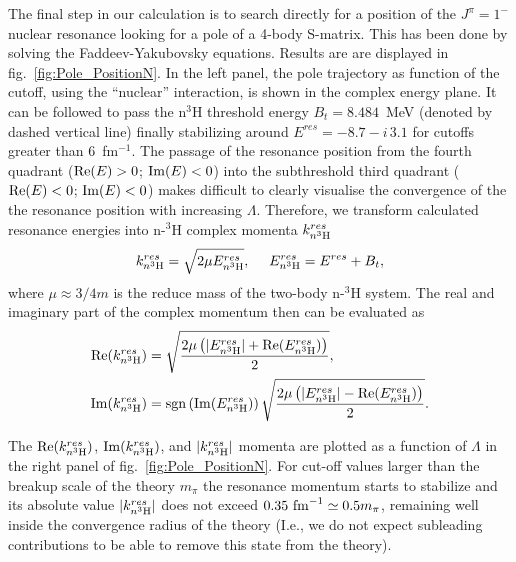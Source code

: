 \documentclass[5p,times]{elsarticle}
\begin{document}
%
The final step in our calculation is to search directly for a position of the $J^\pi=1^-$ nuclear resonance looking for a pole of a 4-body S-matrix. This has been done by solving the Faddeev-Yakubovsky equations.
Results are are displayed in fig.~\ref{fig:Pole_PositionN}.
In the left panel, the pole trajectory as function of the cutoff, using the ``nuclear'' interaction, is shown in the complex energy plane. 
It can be followed to pass the n$^3$H threshold energy $B_{t}=8.484$~MeV (denoted by dashed vertical line) finally stabilizing around $E^{res}=-8.7-i\,3.1$ for cutoffs greater than $6$~fm$^{-1}$. The passage of the resonance position from the fourth quadrant (${\rm Re}(E)>0$; ${\rm Im}(E)<0$) into the subthreshold third quadrant (${\rm Re}(E)<0$; ${\rm Im}(E)<0$) makes difficult to clearly visualise the convergence of the the resonance position with increasing $\Lambda$. 
Therefore, we transform calculated resonance energies into n-$^3$H complex momenta $k^{res}_{n ^3{\rm H}}$  
\begin{equation}
    k^{res}_{n ^3{\rm H}} = \sqrt{2 \mu E^{res}_{n ^3{\rm H}}},~~~~E^{res}_{n ^3{\rm H}}= E^{res} + B_{t},
    \label{mmnt}
\end{equation}
where $\mu \approx 3/4 m$ is the reduce mass of the two-body n-$^3$H system. The real and imaginary part of the complex momentum then can be evaluated as  
\begin{equation}
    \begin{split}
        {\rm Re}(k^{res}_{n ^3{\rm H}}) &= \sqrt{\frac{2\mu \left(|E^{res}_{n ^3{\rm H}}|+{\rm Re}(E^{res}_{n ^3{\rm H}})\right)}{2}},\\
        {\rm Im}(k^{res}_{n ^3{\rm H}}) &=  {\rm sgn}\left({\rm Im}(E^{res}_{n ^3{\rm H}})\right)\sqrt{\frac{2\mu \left(|E^{res}_{n ^3{\rm H}}|-{\rm Re}(E^{res}_{n ^3{\rm H}})\right)}{2}}.\\
    \end{split}
    \label{kreim}
\end{equation}

The ${\rm Re}(k^{res}_{n ^3{\rm H}})$, ${\rm Im}(k^{res}_{n ^3{\rm H}})$, and $|k^{res}_{n ^3{\rm H}}|$ momenta are plotted as a function of $\Lambda$ in the right panel of fig.~\ref{fig:Pole_PositionN}.  
For cut-off values larger than the breakup scale of the theory $m_\pi$ the resonance momentum starts to stabilize and its absolute value $|k^{res}_{n ^3{\rm H}}|$ does not exceed $0.35~{\rm fm}^{-1}\simeq 0.5 m_\pi$, remaining well inside the convergence radius of the theory (I.e., we do not expect subleading contributions to be able to remove this state from the theory).
%
\end{document}
